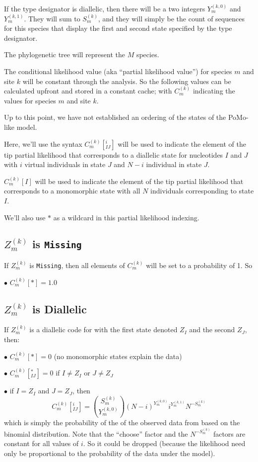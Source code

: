 \documentclass{llncs}
\newcommand{\virtPopSize}{\ensuremath{N}}
\newcommand{\pomo}{PoMo\xspace}
\begin{document}
If the type designator is diallelic, then there will be a two integers $Y_m^{(k,0)}$ and $Y_m^{(k,1)}$.
They will sum to $S_m^{(k)}$, and they will simply be the count of sequences for this species that display the first and second state specified by the type designator.

The phylogenetic tree will represent the $M$ species.

The conditional likelihood value (aka ``partial likelihood value'') for species $m$ and site $k$ will be constant through the analysis.
So the following values can be calculated upfront and stored in a constant cache;
with $C_m^{(k)}$ indicating the values for species $m$ and site $k$.

Up to this point, we have not established an ordering of the states of the \pomo-like model.

Here, we'll use the syntax $C_m^{(k)}[^{i}_{IJ}]$ will be used to indicate the element of 
    the tip partial likelihood that corresponds to a diallelic state for nucleotides $I$ and $J$
    with $i$ virtual individuals in state $J$ and $N-i$ individual in state $J$.

$C_m^{(k)}[I]$ will be used to indicate the element of 
    the tip partial likelihood that corresponds to a monomorphic state with all $\virtPopSize$
    individuals corresponding to state $I$.

We'll also use $\ast$ as a wildcard in this partial likelihood indexing.

\subsection*{$Z_m^{(k)}$ is \texttt{Missing}}
If $Z_m^{(k)}$ is \texttt{Missing}, then all elements of $C_m^{(k)}$ will be set to a probability of 1. So
\begin{compactitem}
    \item[$\bullet$] $C_m^{(k)}[\ast]=1.0$
\end{compactitem}

\subsection*{$Z_m^{(k)}$ is Diallelic}
If $Z_m^{(k)}$ is a diallelic code for with the first state denoted $Z_I$ and the second $Z_J$, then:
\begin{compactitem}
    \item[$\bullet$] $C_m^{(k)}[*] = 0$  (no monomorphic states explain the data)
    \item[$\bullet$] $C_m^{(k)}[^{\ast}_{IJ}] = 0$  if $I\neq Z_I$ or $J\neq Z_J$
    \item[$\bullet$] if $I = Z_I$ and $J = Z_J$, then
     $$C_m^{(k)}[^{i}_{IJ}] = {S_m^{(k)} \choose Y_m^{(k,0)}} (\virtPopSize - i)^{Y_m^{(k,0)}}i^{Y_m^{(k,1)}} \virtPopSize^{-S_m^{(k)}}$$
     which is simply the probability of the of the observed data from based on the binomial distribution.
     Note that the ``choose'' factor and the $ \virtPopSize^{-S_m^{(k)}}$ factors are constant for all values of $i$. So it could be dropped (because the likelihood need only be proportional to the probability of the data under the model).
\end{compactitem}
\end{document}
